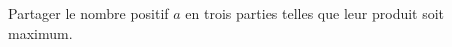 \begin{exercice}\label{exoFoncDeuxVar0009}

Partager le nombre positif $a$ en trois parties telles que leur produit soit maximum.

\end{exercice}
